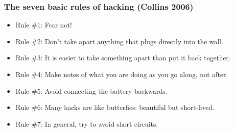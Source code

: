 \documentclass[screen, aspectratio=169]{beamer}
\begin{document}
\begin{frame}
  \frametitle{The seven basic rules of hacking (Collins 2006)}
        \begin{itemize}
	\item Rule \#1: Fear not!
	\item Rule \#2: Don't take apart anything that plugs directly into the wall.
	\item Rule \#3: It is easier to take something apart than put it back together.
	\item Rule \#4: Make notes of what you are doing as you go along, not after.
	\item Rule \#5: Avoid connecting the battery backwards.
	\item Rule \#6: Many hacks are like butterfies: beautiful but short-lived.
	\item Rule \#7: In general, try to avoid short circuits.
    \end{itemize} 
\end{frame}
%
\end{document}
